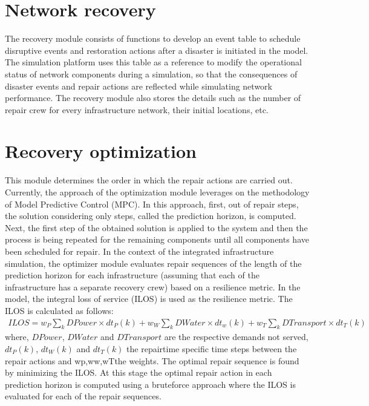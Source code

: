 \documentclass[letterpaper,10pt,english]{sphinxmanual}
\begin{document}
\section{Network recovery}
\label{\detokenize{model:network-recovery}}
\sphinxAtStartPar
The recovery module consists of functions to develop an event table to schedule disruptive events and restoration actions after a disaster
is initiated in the model. The simulation platform uses this table as a reference to modify the operational status of network components
during a simulation, so that the consequences of disaster events and repair actions are reflected while simulating network performance. The
recovery module also stores the details such as the number of repair crew for every infrastructure network, their initial locations, etc.


\section{Recovery optimization}
\label{\detokenize{model:recovery-optimization}}
\sphinxAtStartPar
This module determines the order in which the repair actions are carried out. Currently, the approach of the optimization module leverages
on the methodology of Model Predictive Control (MPC). In this approach, first, out of  repair steps, the solution considering only  steps,
called the prediction horizon, is computed. Next, the first step of the obtained solution is applied to the system and then the process is
being repeated for the remaining  components until all components have been scheduled for repair. In the context of the integrated infrastructure
simulation, the optimizer module evaluates repair sequences of the length of the prediction horizon for each infrastructure (assuming that each of
the infrastructure has a separate recovery crew) based on a resilience metric. In the model, the integral loss of service (ILOS) is used as the
resilience metric. The ILOS is calculated as follows:
\begin{equation*}
\begin{split}ILOS = w_{P}\sum_{k}DPower\times dt_{P}(k)+w_{W}\sum_{k}DWater\times dt_{w}(k)+w_{T}\sum_{k}DTransport\times dt_{T}(k)\end{split}
\end{equation*}
\sphinxAtStartPar
where, \(DPower\), \(DWater\) and \(DTransport\) are the respective demands not served, \(dt_{P}(k)\), \(dt_{W}(k)\) and \(dt_{T}(k)\)
the repair\sphinxhyphen{}time specific time steps between the repair actions and wp,ww,wTthe weights. The optimal repair sequence is found by minimizing the ILOS. At this stage
the optimal repair action in each prediction horizon is computed using a brute\sphinxhyphen{}force approach where the ILOS is evaluated for each of the repair sequences.
\end{document}
